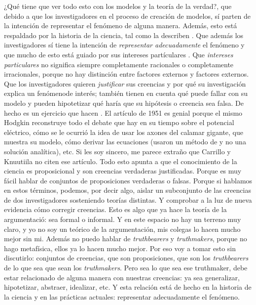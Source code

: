 ¿Qué tiene que ver todo esto con los modelos y la teoría de la verdad?, que debido a que los investigadores en el proceso de creación de modelos, sí parten de la intención de representar el fenómeno de alguna manera.
Además, esto está respaldado por la historia de la ciencia, tal como la describen \textcite{Hessen2009, Grossmann2009, blasjo2022}.
Que además los investigadores sí tiene la intención de \emph{representar adecuadamente} el fenómeno y que mucho de esto está guiado por sus intereses partículares \textcite{friedman}.
Que \emph{intereses particulares} no significa siempre completamente racionales o completamente irracionales, porque no hay distinción entre factores externos y factores externos.
Que los investigadores quieren \emph{justificar} sus creencias y por qué su investigación explica un fenómenode interés; también tienen en cuenta qué puede fallar con su modelo y pueden hipotetizar qué haría que su hipótesis o creencia sea falsa.
De hecho es un ejercicio que hacen \textcite{Hodgkin1951, Hodgkin1952a, Hodgkin1952b}.
El artículo de 1951 es genial porque el mismo Hodgkin reconstruye todo el debate que hay en su tiempo sobre el potencial eléctrico, cómo se le ocurrió la idea de usar los axones del calamar gigante, que muestra su modelo, cómo derivar las ecuaciones (usaron un método de  y no una solución analítica), etc.
Si les soy sincero, me parece extraño que Carrillo y Knuutiila no citen ese artículo.
Todo esto apunta a que el conocimiento de la ciencia es proposicional y son creencias verdaderas justificadas.
Porque es muy fácil hablar de conjuntos de proposiciones verdaderas o falsas.
Porque si hablamos en estos términos, podemos, por decir algo, aislar un subconjunto de las creencias de dos investigadores sosteniendo teorías distintas.
Y comprobar a la luz de nueva evidencia cómo corregir creencias.
Esto es algo que ya hace la teoría de la argumentació: sea formal o informal.
Y en este espacio no hay un terreno muy claro, y yo no soy un teórico de la argumentación, mis colegas lo hacen mucho mejor sin mi.
Además no puedo hablar de \emph{truthbearers} y \emph{truthmakers}, porque no hago metafísica, ellos ya lo hacen mucho mejor.
Por eso voy a tomar esto sin discutirlo: conjuntos de creencias, que son proposiciones, que son los \emph{truthbearers} de lo que sea que sean los \emph{truthmakers}.
Pero sea lo que sea ese truthmaker, debe estar relacionado de alguna manera con nuestras creencias: ya sea generalizar, hipotetizar, abstraer, idealizar, etc.
Y esta relación está de hecho en la historia de la ciencia y en las prácticas actuales: representar adecuadamente el fenómeno.
